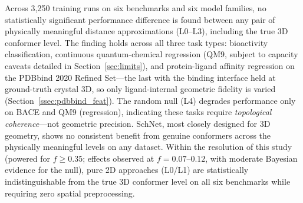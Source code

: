 \documentclass[pdflatex,sn-vancouver-num]{sn-jnl}%
\theoremstyle{thmstyleone}%
\theoremstyle{thmstyletwo}%
\theoremstyle{thmstylethree}%
\begin{document}
Across 3,250 training runs on six benchmarks and six model families,
no statistically significant performance difference is found between
any pair of physically meaningful distance approximations (L0--L3),
including the true 3D conformer level.  The finding holds across all three task
types: bioactivity classification, continuous quantum-chemical regression (QM9, subject to capacity caveats detailed in Section~\ref{sec:limits}),
and protein-ligand affinity regression on the PDBbind 2020 Refined Set---the last with the binding interface held at ground-truth crystal 3D, so only ligand-internal geometric fidelity is varied (Section~\ref{ssec:pdbbind_feat}).  The random null (L4) degrades
performance only on BACE and QM9 (regression), indicating these tasks require
\emph{topological coherence}---not geometric precision.  SchNet, most
closely designed for 3D geometry, shows no consistent benefit from genuine
conformers across the physically meaningful levels on any dataset.  Within the resolution of this study (powered for $f \geq 0.35$; effects observed at $f = 0.07$--$0.12$, with moderate Bayesian evidence for the null), pure 2D approaches (L0/L1) are statistically indistinguishable from the true 3D conformer level on all six benchmarks while requiring zero spatial preprocessing.
\end{document}
